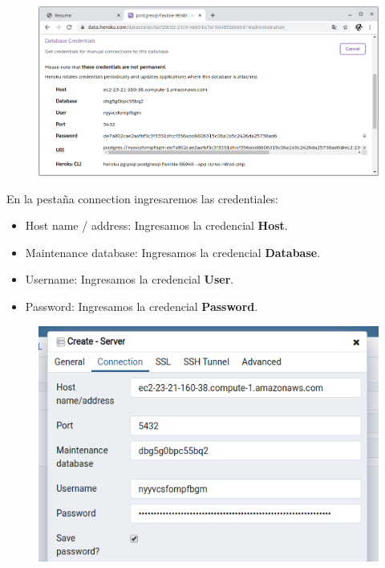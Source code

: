 \documentclass{article}
\begin{document}
\begin{figure}[h!]
  \centering
  \includegraphics[scale=0.5]{./Pictures/270_database_credentials.png}
\end{figure}

En la pestaña connection ingresaremos las credentiales:

\begin{itemize}
  \item Host name / address: Ingresamos la credencial \textbf{Host}.
  \item Maintenance database: Ingresamos la credencial \textbf{Database}.
  \item Username: Ingresamos la credencial \textbf{User}.
  \item Password: Ingresamos la credencial \textbf{Password}.
\end{itemize}

\begin{figure}[h!]
  \centering
  \includegraphics[scale=0.5]{./Pictures/272_conection.png}
\end{figure}
\end{document}
